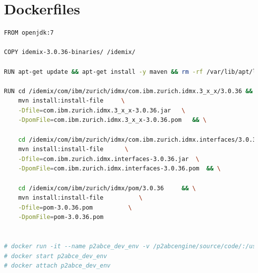 
\chapter{Dockerfiles}\label{ch:docker}

\begin{lstlisting}[language=bash,frame=tb,caption={Dockerfile for P2ABCE},label=lst:dockerP2ABCE]
FROM openjdk:7

COPY idemix-3.0.36-binaries/ /idemix/

RUN apt-get update && apt-get install -y maven && rm -rf /var/lib/apt/lists/*

RUN	cd /idemix/com/ibm/zurich/idmx/com.ibm.zurich.idmx.3_x_x/3.0.36 && \
	mvn install:install-file     \
	-Dfile=com.ibm.zurich.idmx.3_x_x-3.0.36.jar   \
	-DpomFile=com.ibm.zurich.idmx.3_x_x-3.0.36.pom   && \
	
	cd /idemix/com/ibm/zurich/idmx/com.ibm.zurich.idmx.interfaces/3.0.36  && \
	mvn install:install-file      \
	-Dfile=com.ibm.zurich.idmx.interfaces-3.0.36.jar  \
	-DpomFile=com.ibm.zurich.idmx.interfaces-3.0.36.pom  && \
	
	cd /idemix/com/ibm/zurich/idmx/pom/3.0.36     && \
	mvn install:install-file          \
	-Dfile=pom-3.0.36.pom          \
	-DpomFile=pom-3.0.36.pom


# docker run -it --name p2abce_dev_env -v /p2abcengine/source/code/:/usr/src/mymaven -w /usr/src/mymaven/Code/core-abce p2abce_env bash
# docker start p2abce_dev_env
# docker attach p2abce_dev_env
\end{lstlisting}

\hfil

